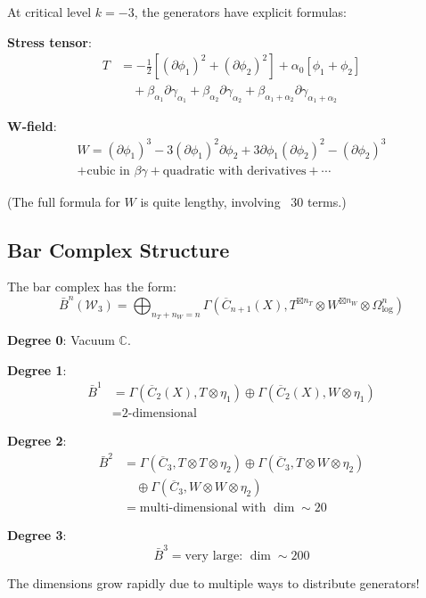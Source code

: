 \begin{theorem}\label{thm:w3-wakimoto}
At critical level $k = -3$, the generators have explicit formulas:

\textbf{Stress tensor}:
\begin{align}
T &= -\frac{1}{2}[(\partial\phi_1)^2 + (\partial\phi_2)^2] + \alpha_0[\phi_1 + \phi_2] \\
&\quad + \beta_{\alpha_1}\partial\gamma_{\alpha_1} + \beta_{\alpha_2}\partial\gamma_{\alpha_2} + \beta_{\alpha_1+\alpha_2}\partial\gamma_{\alpha_1+\alpha_2}
\end{align}

\textbf{W-field}:
\begin{multline}
W = (\partial\phi_1)^3 - 3(\partial\phi_1)^2\partial\phi_2 + 3\partial\phi_1(\partial\phi_2)^2 - (\partial\phi_2)^3 \\
+ \text{cubic in } \beta\gamma + \text{quadratic with derivatives} + \cdots
\end{multline}

(The full formula for $W$ is quite lengthy, involving ~30 terms.)
\end{theorem}

\subsection{Bar Complex Structure}

\begin{construction}\label{const:w3-bar}
The bar complex has the form:
\begin{equation}
\bar{B}^n(\mathcal{W}_3) = \bigoplus_{n_T + n_W = n} \Gamma(\overline{C}_{n+1}(X), T^{\boxtimes n_T} \otimes W^{\boxtimes n_W} \otimes \Omega^n_{\log})
\end{equation}

\textbf{Degree 0}: Vacuum $\mathbb{C}$.

\textbf{Degree 1}: 
\begin{align}
\bar{B}^1 &= \Gamma(\overline{C}_2(X), T \otimes \eta_1) \oplus \Gamma(\overline{C}_2(X), W \otimes \eta_1) \\
&= \text{2-dimensional}
\end{align}

\textbf{Degree 2}:
\begin{align}
\bar{B}^2 &= \Gamma(\overline{C}_3, T \otimes T \otimes \eta_2) \oplus \Gamma(\overline{C}_3, T \otimes W \otimes \eta_2) \\
&\quad \oplus \Gamma(\overline{C}_3, W \otimes W \otimes \eta_2) \\
&= \text{multi-dimensional with } \dim \sim 20
\end{align}

\textbf{Degree 3}:
\begin{equation}
\bar{B}^3 = \text{very large: } \dim \sim 200
\end{equation}

The dimensions grow rapidly due to multiple ways to distribute generators!
\end{construction}


